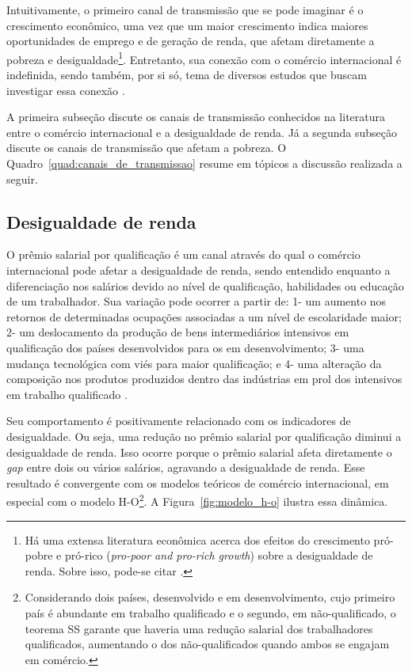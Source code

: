 Intuitivamente, o primeiro canal de transmissão que se pode imaginar é o crescimento econômico, uma vez que um maior crescimento indica maiores oportunidades de emprego e de geração de renda, que afetam diretamente a pobreza e desigualdade\footnote{Há uma extensa literatura econômica acerca dos efeitos do crescimento pró-pobre e pró-rico (\textit{pro-poor and pro-rich growth}) sobre a desigualdade de renda. Sobre isso, pode-se citar \textcite{ravallion04, thorbecke22}.}. Entretanto, sua conexão com o comércio internacional é indefinida, sendo também, por si só, tema de diversos estudos que buscam investigar essa conexão \cite{anderson16, dix17, gnangnon18}.

A primeira subseção discute os canais de transmissão conhecidos na literatura entre o comércio internacional e a desigualdade de renda. Já a segunda subseção discute os canais de transmissão que afetam a pobreza. O Quadro~\ref{quad:canais_de_transmissao} resume em tópicos a discussão realizada a seguir.

\subsection{Desigualdade de renda} \label{subsec:desigualdade_de_renda}

O prêmio salarial por qualificação é um canal através do qual o comércio internacional pode afetar a desigualdade de renda, sendo entendido enquanto a diferenciação nos salários devido ao nível de qualificação, habilidades ou educação de um trabalhador. Sua variação pode ocorrer a partir de: 1- um aumento nos retornos de determinadas ocupações associadas a um nível de escolaridade maior; 2- um deslocamento da produção de bens intermediários intensivos em qualificação dos países desenvolvidos para os em desenvolvimento; 3- uma mudança tecnológica com viés para maior qualificação; e 4- uma alteração da composição nos produtos produzidos dentro das indústrias em prol dos intensivos em trabalho qualificado \cite{goldbergpavcnik04}.

Seu comportamento é positivamente relacionado com os indicadores de desigualdade. Ou seja, uma redução no prêmio salarial por qualificação diminui a desigualdade de renda. Isso ocorre porque o prêmio salarial afeta diretamente o \textit{gap} entre dois ou vários salários, agravando a desigualdade de renda. Esse resultado é convergente com os modelos teóricos de comércio internacional, em especial com o modelo H-O\footnote{Considerando dois países, desenvolvido e em desenvolvimento, cujo primeiro país é abundante em trabalho qualificado e o segundo, em não-qualificado, o teorema SS garante que haveria uma redução salarial dos trabalhadores qualificados, aumentando o dos não-qualificados quando ambos se engajam em comércio.}. A Figura~\ref{fig:modelo_h-o} ilustra essa dinâmica.

